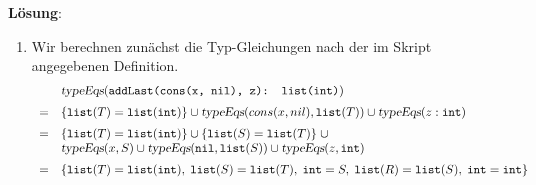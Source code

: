 \documentclass{article}
\newcommand{\solution}{
\vspace*{0.3cm}

\noindent
\textbf{L\"osung}: }
\begin{document}
\solution
\begin{enumerate}
\item Wir berechnen zun\"achst die Typ-Gleichungen nach der im Skript angegebenen Definition.
      \[
      \begin{array}[t]{cl}
           & \textsl{typeEqs}(\texttt{addLast(cons(x, nil), z): list(int)}) \\[0.2cm]
         = &       \{ \mathtt{list}(T) = \mathtt{list(int)} \} 
              \cup \textsl{typeEqs}(cons(x, nil), \mathtt{list}(T))
              \cup \textsl{typeEqs}(z: \mathtt{int})                     \\[0.2cm]
         = &       \{ \mathtt{list}(T) = \mathtt{list(int)} \} 
              \cup \{ \texttt{list}(S) = \mathtt{list}(T) \}\; \cup \\
           &       \textsl{typeEqs}(x, S)
              \cup \textsl{typeEqs}(\mathtt{nil}, \mathtt{list}(S))
              \cup \textsl{typeEqs}(z, \mathtt{int})                  \\[0.2cm]
         = &       \{ \mathtt{list}(T) = \mathtt{list(int)},\; 
                      \texttt{list}(S) = \mathtt{list}(T),\;           \mathtt{int} = S,\;
                      \mathtt{list}(R) = \mathtt{list}(S),\;
                      \mathtt{int} = \mathtt{int} \}


\end{array}\]
\end{enumerate}
\end{document}
